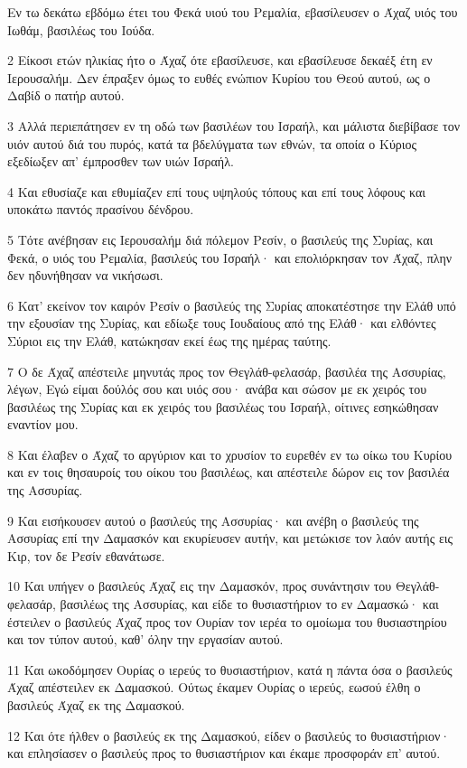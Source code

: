 \par Εν τω δεκάτω εβδόμω έτει του Φεκά υιού του Ρεμαλία, εβασίλευσεν ο Άχαζ υιός του Ιωθάμ, βασιλέως του Ιούδα.
\par 2 Είκοσι ετών ηλικίας ήτο ο Άχαζ ότε εβασίλευσε, και εβασίλευσε δεκαέξ έτη εν Ιερουσαλήμ. Δεν έπραξεν όμως το ευθές ενώπιον Κυρίου του Θεού αυτού, ως ο Δαβίδ ο πατήρ αυτού.
\par 3 Αλλά περιεπάτησεν εν τη οδώ των βασιλέων του Ισραήλ, και μάλιστα διεβίβασε τον υιόν αυτού διά του πυρός, κατά τα βδελύγματα των εθνών, τα οποία ο Κύριος εξεδίωξεν απ' έμπροσθεν των υιών Ισραήλ.
\par 4 Και εθυσίαζε και εθυμίαζεν επί τους υψηλούς τόπους και επί τους λόφους και υποκάτω παντός πρασίνου δένδρου.
\par 5 Τότε ανέβησαν εις Ιερουσαλήμ διά πόλεμον Ρεσίν, ο βασιλεύς της Συρίας, και Φεκά, ο υιός του Ρεμαλία, βασιλεύς του Ισραήλ· και επολιόρκησαν τον Άχαζ, πλην δεν ηδυνήθησαν να νικήσωσι.
\par 6 Κατ' εκείνον τον καιρόν Ρεσίν ο βασιλεύς της Συρίας αποκατέστησε την Ελάθ υπό την εξουσίαν της Συρίας, και εδίωξε τους Ιουδαίους από της Ελάθ· και ελθόντες Σύριοι εις την Ελάθ, κατώκησαν εκεί έως της ημέρας ταύτης.
\par 7 Ο δε Άχαζ απέστειλε μηνυτάς προς τον Θεγλάθ-φελασάρ, βασιλέα της Ασσυρίας, λέγων, Εγώ είμαι δούλός σου και υιός σου· ανάβα και σώσον με εκ χειρός του βασιλέως της Συρίας και εκ χειρός του βασιλέως του Ισραήλ, οίτινες εσηκώθησαν εναντίον μου.
\par 8 Και έλαβεν ο Άχαζ το αργύριον και το χρυσίον το ευρεθέν εν τω οίκω του Κυρίου και εν τοις θησαυροίς του οίκου του βασιλέως, και απέστειλε δώρον εις τον βασιλέα της Ασσυρίας.
\par 9 Και εισήκουσεν αυτού ο βασιλεύς της Ασσυρίας· και ανέβη ο βασιλεύς της Ασσυρίας επί την Δαμασκόν και εκυρίευσεν αυτήν, και μετώκισε τον λαόν αυτής εις Κιρ, τον δε Ρεσίν εθανάτωσε.
\par 10 Και υπήγεν ο βασιλεύς Άχαζ εις την Δαμασκόν, προς συνάντησιν του Θεγλάθ-φελασάρ, βασιλέως της Ασσυρίας, και είδε το θυσιαστήριον το εν Δαμασκώ· και έστειλεν ο βασιλεύς Άχαζ προς τον Ουρίαν τον ιερέα το ομοίωμα του θυσιαστηρίου και τον τύπον αυτού, καθ' όλην την εργασίαν αυτού.
\par 11 Και ωκοδόμησεν Ουρίας ο ιερεύς το θυσιαστήριον, κατά η πάντα όσα ο βασιλεύς Άχαζ απέστειλεν εκ Δαμασκού. Ούτως έκαμεν Ουρίας ο ιερεύς, εωσού έλθη ο βασιλεύς Άχαζ εκ της Δαμασκού.
\par 12 Και ότε ήλθεν ο βασιλεύς εκ της Δαμασκού, είδεν ο βασιλεύς το θυσιαστήριον· και επλησίασεν ο βασιλεύς προς το θυσιαστήριον και έκαμε προσφοράν επ' αυτού.
